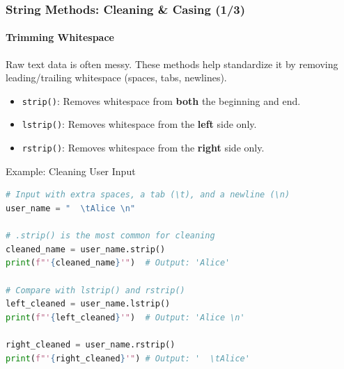 \documentclass{beamer}
\begin{document}
\begin{frame}[fragile]
    \frametitle{String Methods: Cleaning \& Casing (1/3)}
    \framesubtitle{Trimming Whitespace}
    
    Raw text data is often messy. These methods help standardize it by removing leading/trailing whitespace (spaces, tabs, newlines).
    
    \begin{itemize}
        \item \texttt{strip()}: Removes whitespace from \textbf{both} the beginning and end.
        \item \texttt{lstrip()}: Removes whitespace from the \textbf{left} side only.
        \item \texttt{rstrip()}: Removes whitespace from the \textbf{right} side only.
    \end{itemize}
    
    \begin{block}{Example: Cleaning User Input}
\begin{lstlisting}[language=Python]
# Input with extra spaces, a tab (\t), and a newline (\n)
user_name = "  \tAlice \n"

# .strip() is the most common for cleaning
cleaned_name = user_name.strip() 
print(f"'{cleaned_name}'")  # Output: 'Alice'

# Compare with lstrip() and rstrip()
left_cleaned = user_name.lstrip()
print(f"'{left_cleaned}'")  # Output: 'Alice \n'

right_cleaned = user_name.rstrip()
print(f"'{right_cleaned}'") # Output: '  \tAlice'
\end{lstlisting}
    \end{block}
    
\end{frame}
\end{document}
